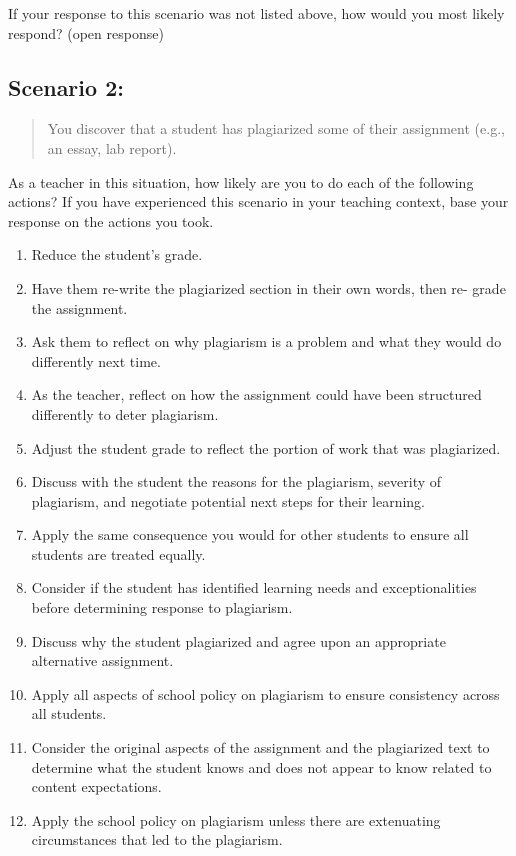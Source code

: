 \documentclass[
]{book}
\providecommand{\tightlist}{%
  \setlength{\itemsep}{0pt}\setlength{\parskip}{0pt}}
\begin{document}
If your response to this scenario was not listed above, how would you most likely respond? (open response)

\hypertarget{scenario-2}{%
\subsection{Scenario 2:}\label{scenario-2}}

\begin{quote}
You discover that a student has plagiarized some of their assignment (e.g., an essay, lab report).
\end{quote}

As a teacher in this situation, how likely are you to do each of the following actions? If you have experienced this scenario in your teaching context, base your response on the actions you took.

\begin{enumerate}
\def\labelenumi{\arabic{enumi}.}
\tightlist
\item
  Reduce the student's grade.
\item
  Have them re-write the plagiarized section in their own words, then re- grade the assignment.
\item
  Ask them to reflect on why plagiarism is a problem and what they would do differently next time.
\item
  As the teacher, reflect on how the assignment could have been structured differently to deter plagiarism.
\item
  Adjust the student grade to reflect the portion of work that was plagiarized.
\item
  Discuss with the student the reasons for the plagiarism, severity of plagiarism, and negotiate potential next steps for their learning.
\item
  Apply the same consequence you would for other students to ensure all students are treated equally.
\item
  Consider if the student has identified learning needs and exceptionalities before determining response to plagiarism.
\item
  Discuss why the student plagiarized and agree upon an appropriate alternative assignment.
\item
  Apply all aspects of school policy on plagiarism to ensure consistency across all students.
\item
  Consider the original aspects of the assignment and the plagiarized text to determine what the student knows and does not appear to know related to content expectations.
\item
  Apply the school policy on plagiarism unless there are extenuating circumstances that led to the plagiarism.
\end{enumerate}
\end{document}
